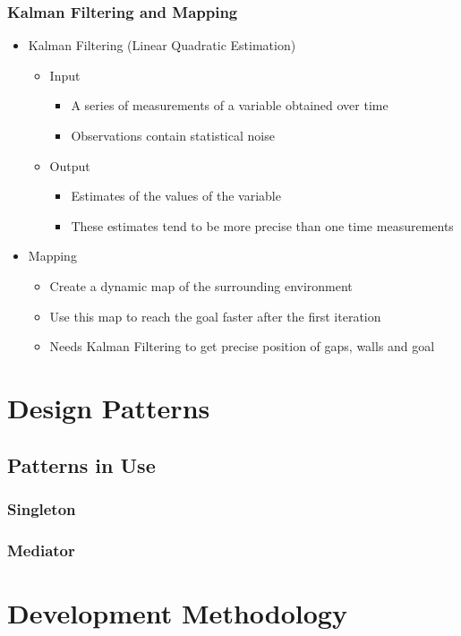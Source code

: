 \documentclass{beamer}
\begin{document}
\begin{frame}
\frametitle{Kalman Filtering and Mapping}
\begin{itemize}
\item Kalman Filtering (Linear Quadratic Estimation)
\begin{itemize}
\item Input
\begin{itemize}
\item A series of measurements of a variable obtained over time
\item Observations contain statistical noise
\end{itemize}
\item Output
\begin{itemize}
\item Estimates of the values of the variable
\item These estimates tend to be more precise than one time measurements
\end{itemize}
\end{itemize}
\item Mapping
\begin{itemize}
\item Create a dynamic map of the surrounding environment
\item Use this map to reach the goal faster after the first iteration
\item Needs Kalman Filtering to get precise position of gaps, walls and goal
\end{itemize}
\end{itemize}



\end{frame}
\section{Design Patterns}
\subsection{Patterns in Use}
\begin{frame}
\frametitle{Singleton}
\end{frame}

\begin{frame}
\frametitle{Mediator}
\end{frame}
\section{Development Methodology}
\end{document}
